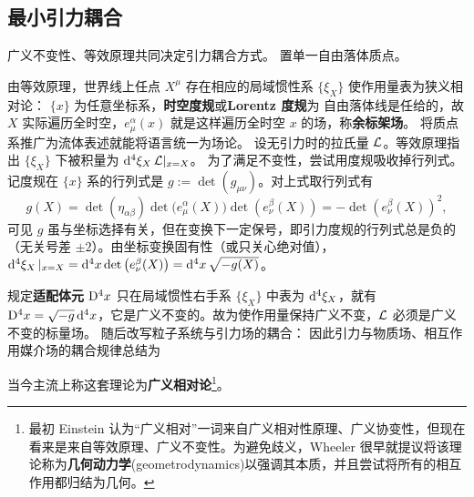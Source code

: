 \subsection{最小引力耦合}

广义不变性、等效原理共同决定引力耦合方式。
置单一自由落体质点。



由等效原理，世界线上任点 $X^\mu$ 存在相应的局域惯性系 $\{\xi_X\}$ 使作用量表为狭义相对论：
$\{x\}$ 为任意坐标系，\textbf{时空度规}或\textbf{Lorentz 度规}为
自由落体线是任给的，故 $X$ 实际遍历全时空，$e^\alpha_\mu(x)$ 就是这样遍历全时空 $x$ 的场，称\textbf{余标架场}。
将质点系推广为流体表述就能将语言统一为场论。
设无引力时的拉氏量 $\mathcal{L}$。等效原理指出 $\{\xi_X\}$ 下被积量为 $\dd[4]{\xi_X} \mathcal{L}|_{x=X}$。
为了满足不变性，尝试用度规吸收掉行列式。
记度规在 $\{x\}$ 系的行列式是 $g:=\det(g_{\mu\nu})$。对上式取行列式有
\[g(X)=\det(\eta_{\alpha\beta})\det\big(e^\alpha_\mu(X)\big)\det(e^\beta_\nu(X))=-\det(e^\beta_\nu(X))^{2},\]
可见 $g$ 虽与坐标选择有关，但在变换下一定保号，即引力度规的行列式总是负的（无关号差 $\pm 2$）。由坐标变换固有性（或只关心绝对值），$\dd[4]{\xi_X}|_{x=X} = \dd[4]{x} \det\big(e^\beta_\nu(X)\big) = \dd[4]{x}\sqrt{-g(X)}$。



规定\textbf{适配体元} $\D[4] x$ 只在局域惯性右手系 $\{\xi_X\}$ 中表为 $\dd[4]\xi_X$，就有 $\D[4] x=\sqrt{-g}\d[4]{x}$，它是广义不变的。故为使作用量保持广义不变，$\mathcal{L}$ 必须是广义不变的标量场。
随后改写粒子系统与引力场的耦合：
因此引力与物质场、相互作用媒介场的耦合规律总结为
\begin{center}
\end{center}
当今主流上称这套理论为\textbf{广义相对论}\footnote{最初 Einstein 认为“广义相对”一词来自广义相对性原理、广义协变性，但现在看来是来自等效原理、广义不变性。为避免歧义，Wheeler 很早就提议将该理论称为\textbf{几何动力学}(geometrodynamics)以强调其本质，并且尝试将所有的相互作用都归结为几何。}。

